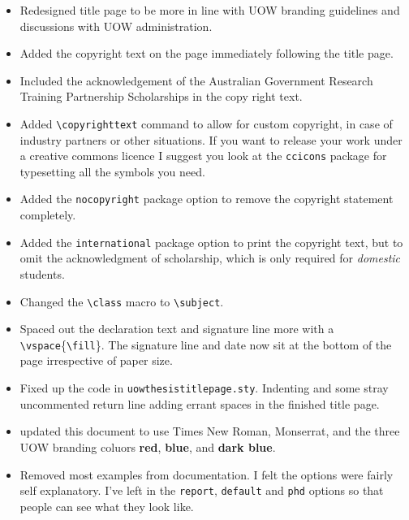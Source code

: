 \documentclass[12pt,oneside]{article}
\newcommand{\option}[1]{\texttt{\color{UOWblue}#1}}
\newcommand{\command}[1]{\texttt{\color{UOWred}#1}}
\begin{document}
\begin{itemize}
  \item Redesigned title page to be more in line with UOW branding guidelines and discussions with UOW administration.
  \item Added the copyright text on the page immediately following the title page.
  \item Included the acknowledgement of the Australian Government Research Training Partnership Scholarships in the copy right text.
  \item Added \command{\textbackslash{}copyrighttext} command to allow for custom copyright, in case of industry partners or other situations. If you want to release your work under a creative commons licence I suggest you look at the \texttt{ccicons} package for typesetting all the symbols you need.
  \item Added the \option{nocopyright} package option to remove the copyright statement completely.
  \item Added the \option{international} package option to print the copyright text, but to omit the acknowledgment of scholarship, which is only required for \emph{domestic} students.
  \item Changed the \command{\textbackslash{}class} macro to \command{\textbackslash{}subject}.
  \item Spaced out the declaration text and signature line more with a \command{\textbackslash{}vspace}\{\command{\textbackslash{}fill}\}. The signature line and date now sit at the bottom of the page irrespective of paper size.
  \item Fixed up the code in \texttt{uowthesistitlepage.sty}. Indenting and some stray uncommented return line adding errant spaces in the finished title page.
  \item updated this document to use Times New Roman, \textsf{Monserrat}, and the three UOW branding coluors \textcolor{UOWred}{\textbf{red}}, \textcolor{UOWblue}{\textbf{blue}}, and \textcolor{UOWdarkblue}{\textbf{dark blue}}.
  \item Removed most examples from documentation. I felt the options were fairly self explanatory. I've left in the \option{report}, \option{default} and \option{phd} options so that people can see what they look like.
\end{itemize}
\end{document}
